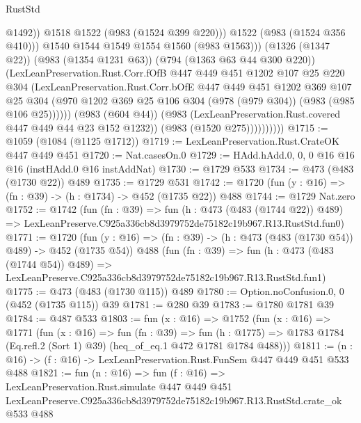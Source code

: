 \begin{lexlean}{RustStd}
\begin{coremodule}
                                  @1492))
                              @1518
                              @1522
                              (@983 (@1524 @399 @220)))
                            @1522
                            (@983 (@1524 @356 @410)))
                          @1540
                          @1544
                          @1549
                          @1554
                          @1560
                          (@983 @1563)))
                      (@1326 (@1347 @22))
                      (@983 (@1354 @1231 @63))
                      (@794 (@1363 @63 @44 @300 @220))
                      (LexLeanPreservation.Rust.Corr.fOfB
                        @447
                        @449
                        @451
                        @1202
                        @107
                        @25
                        @220
                        @304
                        (LexLeanPreservation.Rust.Corr.bOfE
                          @447
                          @449
                          @451
                          @1202
                          @369
                          @107
                          @25
                          @304
                          (@970
                            @1202
                            @369
                            @25
                            @106
                            @304
                            (@978 (@979 @304))
                            (@983 (@985 @106 @25))))))
                    (@983 (@604 @44))
                    (@983 (LexLeanPreservation.Rust.covered @447 @449 @44 @23 @152 @1232))
                    (@983 (@1520 @275))))))))))
@1715 := @1059 (@1084 (@1125 @1712))
@1719 := LexLeanPreservation.Rust.CrateOK @447 @449 @451
@1720 := Nat.casesOn.{0}
@1729 := HAdd.hAdd.{0, 0, 0} @16 @16 @16 (instHAdd.{0} @16 instAddNat)
@1730 := @1729 @533
@1734 := @473 (@483 (@1730 @22)) @489
@1735 := @1729 @531
@1742 := @1720 (fun (y : @16) => (fn : @39) -> (h : @1734) -> @452 (@1735 @22)) @488
@1744 := @1729 Nat.zero
@1752 := @1742
    (fun (fn : @39) =>
    fun (h : @473 (@483 (@1744 @22)) @489) =>
    LexLeanPreserve.C925a336cb8d3979752de75182c19b967.R13.RustStd.fun0)
@1771 := @1720
    (fun (y : @16) => (fn : @39) -> (h : @473 (@483 (@1730 @54)) @489) -> @452 (@1735 @54))
    @488
    (fun (fn : @39) =>
    fun (h : @473 (@483 (@1744 @54)) @489) =>
    LexLeanPreserve.C925a336cb8d3979752de75182c19b967.R13.RustStd.fun1)
@1775 := @473 (@483 (@1730 @115)) @489
@1780 := Option.noConfusion.{0, 0} (@452 (@1735 @115)) @39
@1781 := @280 @39
@1783 := @1780 @1781 @39
@1784 := @487 @533
@1803 := fun (x : @16) =>
  @1752
    (fun (x : @16) =>
    @1771
      (fun (x : @16) =>
      fun (fn : @39) =>
      fun (h : @1775) =>
      @1783 @1784 (Eq.refl.{2} (Sort 1) @39) (heq_of_eq.{1} @472 @1781 @1784 @488)))
@1811 := (n : @16) -> (f : @16) -> LexLeanPreservation.Rust.FunSem @447 @449 @451 @533 @488
@1821 := fun (n : @16) =>
  fun (f : @16) =>
  LexLeanPreservation.Rust.simulate
    @447
    @449
    @451
    LexLeanPreserve.C925a336cb8d3979752de75182c19b967.R13.RustStd.crate_ok
    @533
    @488
\end{coremodule}
\end{lexlean}
